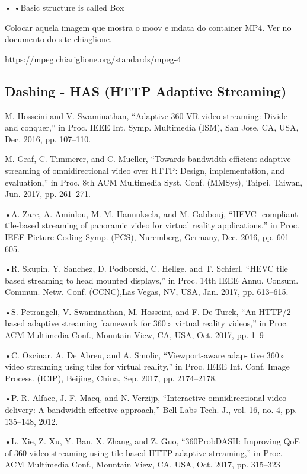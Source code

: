 •	•Basic structure is called Box

Colocar aquela imagem que mostra o moov e mdata do container MP4. Ver no documento do site chiaglione.

\url{https://mpeg.chiariglione.org/standards/mpeg-4}




\subsection{Dashing - HAS (HTTP Adaptive Streaming)}

M. Hosseini and V. Swaminathan, “Adaptive 360 VR video streaming: Divide and conquer,” in Proc. IEEE Int. Symp. Multimedia (ISM), San Jose, CA, USA, Dec. 2016, pp. 107–110.

M. Graf, C. Timmerer, and C. Mueller, “Towards bandwidth efficient adaptive streaming of omnidirectional video over HTTP: Design, implementation, and evaluation,” in Proc. 8th ACM Multimedia Syst. Conf. (MMSys), Taipei, Taiwan, Jun. 2017, pp. 261–271.

•A. Zare, A. Aminlou, M. M. Hannuksela, and M. Gabbouj, “HEVC- compliant tile-based streaming of panoramic video for virtual reality applications,” in Proc. IEEE Picture Coding Symp. (PCS), Nuremberg, Germany, Dec. 2016, pp. 601–605.

•R. Skupin, Y. Sanchez, D. Podborski, C. Hellge, and T. Schierl, “HEVC tile based streaming to head mounted displays,” in Proc. 14th IEEE Annu. Consum. Commun. Netw. Conf. (CCNC),Las Vegas, NV, USA, Jan. 2017, pp. 613–615.

•S. Petrangeli, V. Swaminathan, M. Hosseini, and F. De Turck, “An HTTP/2-based adaptive streaming framework for 360◦ virtual reality videos,” in Proc. ACM Multimedia Conf., Mountain View, CA, USA, Oct. 2017, pp. 1–9

•C. Ozcinar, A. De Abreu, and A. Smolic, “Viewport-aware adap- tive 360◦ video streaming using tiles for virtual reality,” in Proc. IEEE Int. Conf. Image Process. (ICIP), Beijing, China, Sep. 2017, pp. 2174–2178.

•P. R. Alface, J.-F. Macq, and N. Verzijp, “Interactive omnidirectional video delivery: A bandwidth-effective approach,” Bell Labs Tech. J., vol. 16, no. 4, pp. 135–148, 2012.

•L. Xie, Z. Xu, Y. Ban, X. Zhang, and Z. Guo, “360ProbDASH: Improving QoE of 360 video streaming using tile-based HTTP adaptive streaming,” in Proc. ACM Multimedia Conf., Mountain View, CA, USA, Oct. 2017, pp. 315–323

